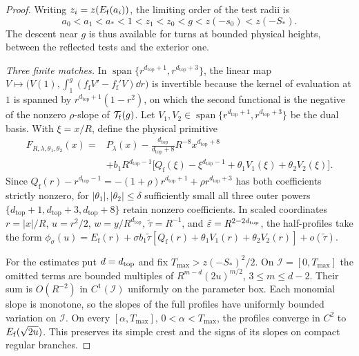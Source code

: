 \begin{proof}
Writing $z_i=z(E_{\rm f}(a_i))$, the limiting order of the test radii is
\[
  a_0<a_1<a_*<1<z_1<z_0<g<z(-s_0)<z(-S_*).
\]
The descent near $g$ is thus available for turns at bounded physical
heights, between the reflected tests and the exterior one.

\smallskip\noindent\emph{Three finite matches.} In
$\operatorname{span}\{r^{d_{\mathrm{top}}+1},r^{d_{\mathrm{top}}+3}\}$, the linear map
$V\mapsto\bigl(V(1),\int_1^g(f_{\mathrm{f}}V'-f_{\mathrm{f}}'V)\dd r\bigr)$ is invertible because the
kernel of evaluation at $1$ is spanned by $r^{d_{\mathrm{top}}+1}(1-r^2)$, on which the second
functional is the negative of the nonzero $\rho$-slope of $\mathcal{T}_{\mathrm{f}}(g)$. Let
$V_1,V_2\in\operatorname{span}\{r^{d_{\mathrm{top}}+1},r^{d_{\mathrm{top}}+3}\}$ be the dual basis.
With $\xi=x/R$, define the physical primitive
\begin{align*}
  F_{R,\lambda,\theta_1,\theta_2}(x)
    ={}& P_\lambda(x) - \frac{d_{\mathrm{top}}}{d_{\mathrm{top}}+8} R^{-8}x^{d_{\mathrm{top}}+8} \\
       & + b_1 R^{d_{\mathrm{top}}-1}\bigl[Q_{\mathrm{f}}(\xi)-\xi^{d_{\mathrm{top}}-1}+\theta_1 V_1(\xi)+\theta_2 V_2(\xi)\bigr].
\end{align*}
Since $Q_{\mathrm{f}}(r)-r^{d_{\mathrm{top}}-1}=-(1+\rho)r^{d_{\mathrm{top}}+1}+\rho
r^{d_{\mathrm{top}}+3}$ has both coefficients strictly nonzero, for $|\theta_1|,|\theta_2|\le\delta$
sufficiently small all three outer powers
$\{d_{\mathrm{top}}+1,d_{\mathrm{top}}+3,d_{\mathrm{top}}+8\}$ retain nonzero coefficients. In scaled
coordinates $r=|x|/R$, $u=r^2/2$, $w=y/R^{d_{\mathrm{top}}}$, $\tilde{\tau}=R^{-1}$, and
$\tilde{\varepsilon}=R^{2-2d_{\mathrm{top}}}$, the half-profiles take the form
$\phi_\sigma(u)=E_{\mathrm{f}}(r)+\sigma b_1\tilde{\tau}[Q_{\mathrm{f}}(r)+\theta_1 V_1(r)+\theta_2
V_2(r)]+o(\tilde{\tau})$.

For the estimates put $d=d_{\rm top}$ and fix $T_{\max}>z(-S_*)^2/2$.
On $\mathcal I=[0,T_{\max}]$ the omitted terms are bounded multiples of
$R^{m-d}(2u)^{m/2}$, $3\le m\le d-2$. Their sum is $O(R^{-2})$ in
$C^1(\mathcal I)$ uniformly on the parameter box. Each monomial slope is
monotone, so the slopes of the full profiles have uniformly bounded
variation on $\mathcal I$. On every $[\alpha,T_{\max}]$, $0<\alpha<T_{\max}$,
the profiles converge in $C^2$ to $E_{\rm f}(\sqrt{2u})$.
This preserves its simple crest and the signs of its slopes on compact
regular branches.


\end{proof}
